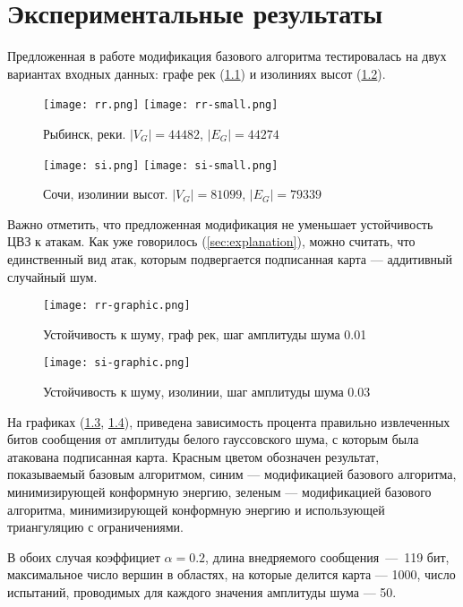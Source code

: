 \chapter{Экспериментальные результаты}

Предложенная в работе модификация базового алгоритма тестировалась на двух вариантах входных данных: графе рек (\ref{pic:rr}) и 
изолиниях высот (\ref{pic:si}).
\begin{figure}[h]
  \centerline {
    \mbox{\texttt{[image: rr.png]}}
    \mbox{\texttt{[image: rr-small.png]}}
  }
  \caption{Рыбинск, реки. $|V_G| = 44482$, $|E_G| = 44274$}
  \label{pic:rr}
\end{figure}
\begin{figure}[h]
  \centerline {
    \mbox{\texttt{[image: si.png]}}
    \mbox{\texttt{[image: si-small.png]}}
  }
  \caption{Сочи, изолинии высот. $|V_G| = 81099$, $|E_G| = 79339$}
  \label{pic:si}
\end{figure}

Важно отметить, что предложенная модификация не уменьшает устойчивость ЦВЗ к атакам. Как уже говорилось (\ref{sec:explanation}), 
можно считать, что единственный вид атак, которым подвергается подписанная карта --- аддитивный случайный шум.
\begin{figure} [p]
    \centerline {
        \texttt{[image: rr-graphic.png]}
    }
    \caption{Устойчивость к шуму, граф рек, шаг амплитуды шума 0.01}
    \label{pic:rr-graphic}
\end{figure}
\begin{figure} [p]
    \centerline {
        \texttt{[image: si-graphic.png]}
    }
    \caption{Устойчивость к шуму, изолинии, шаг амплитуды шума 0.03}
    \label{pic:si-graphic}
\end{figure}
На графиках (\ref{pic:rr-graphic}, \ref{pic:si-graphic}), приведена зависимость процента правильно извлеченных битов сообщения от амплитуды 
белого гауссовского шума, с которым была атакована подписанная карта. Красным цветом обозначен результат, показываемый базовым алгоритмом, 
синим --- модификацией базового алгоритма, минимизирующей конформную энергию, зеленым --- модификацией базового алгоритма, 
минимизирующей конформную энергию и использующей триангуляцию с ограничениями.

В обоих случая коэффициет $\alpha = 0.2$, длина внедряемого сообщения~---~119 бит,
максимальное число вершин в областях, на которые делится карта --- 1000, число испытаний, проводимых для каждого значения амплитуды шума --- 50.

